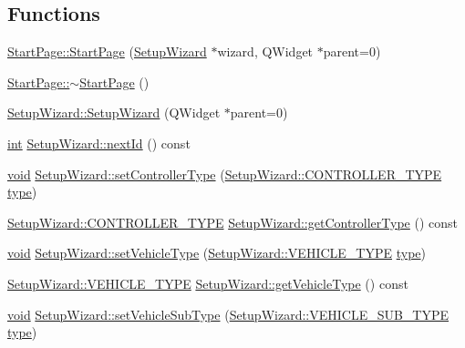 \subsection*{Functions}
\begin{DoxyCompactItemize}
\item 
\hyperlink{group___setup_gac7f13cdee5f6c7c47763882247c4dec8}{Start\-Page\-::\-Start\-Page} (\hyperlink{class_setup_wizard}{Setup\-Wizard} $\ast$wizard, Q\-Widget $\ast$parent=0)
\item 
\hyperlink{group___setup_ga03a08c78d6a2b73a4fe95bfa89e74314}{Start\-Page\-::$\sim$\-Start\-Page} ()
\item 
\hyperlink{group___setup_ga8f260c27631b936af1a8e2a9475ae2f0}{Setup\-Wizard\-::\-Setup\-Wizard} (Q\-Widget $\ast$parent=0)
\item 
\hyperlink{ioapi_8h_a787fa3cf048117ba7123753c1e74fcd6}{int} \hyperlink{group___setup_ga7e04c785013743eebd2ceb833536568d}{Setup\-Wizard\-::next\-Id} () const 
\item 
\hyperlink{group___u_a_v_objects_plugin_ga444cf2ff3f0ecbe028adce838d373f5c}{void} \hyperlink{group___setup_gab45587f98cb648017f85da303efa068c}{Setup\-Wizard\-::set\-Controller\-Type} (\hyperlink{group___vehicle_configuration_source_ga3cfce2b0a501a6fdb7a0ae408ba63556}{Setup\-Wizard\-::\-C\-O\-N\-T\-R\-O\-L\-L\-E\-R\-\_\-\-T\-Y\-P\-E} \hyperlink{glext_8h_a7d05960f4f1c1b11f3177dc963a45d86}{type})
\item 
\hyperlink{group___vehicle_configuration_source_ga3cfce2b0a501a6fdb7a0ae408ba63556}{Setup\-Wizard\-::\-C\-O\-N\-T\-R\-O\-L\-L\-E\-R\-\_\-\-T\-Y\-P\-E} \hyperlink{group___setup_ga1d7c4e20ee0857aef644a2e162ce51e7}{Setup\-Wizard\-::get\-Controller\-Type} () const 
\item 
\hyperlink{group___u_a_v_objects_plugin_ga444cf2ff3f0ecbe028adce838d373f5c}{void} \hyperlink{group___setup_gad78d95f5556264d0ceb480487ffadfb8}{Setup\-Wizard\-::set\-Vehicle\-Type} (\hyperlink{group___vehicle_configuration_source_gaa97253587c69ba0d23535abdc42fad43}{Setup\-Wizard\-::\-V\-E\-H\-I\-C\-L\-E\-\_\-\-T\-Y\-P\-E} \hyperlink{glext_8h_a7d05960f4f1c1b11f3177dc963a45d86}{type})
\item 
\hyperlink{group___vehicle_configuration_source_gaa97253587c69ba0d23535abdc42fad43}{Setup\-Wizard\-::\-V\-E\-H\-I\-C\-L\-E\-\_\-\-T\-Y\-P\-E} \hyperlink{group___setup_gac67d395a98064dde4cd243f78cdef9d4}{Setup\-Wizard\-::get\-Vehicle\-Type} () const 
\item 
\hyperlink{group___u_a_v_objects_plugin_ga444cf2ff3f0ecbe028adce838d373f5c}{void} \hyperlink{group___setup_gaceb7a4422958869c876dd43842e6960c}{Setup\-Wizard\-::set\-Vehicle\-Sub\-Type} (\hyperlink{group___vehicle_configuration_source_gaa22bfa88d750f2b46f66702a723e8342}{Setup\-Wizard\-::\-V\-E\-H\-I\-C\-L\-E\-\_\-\-S\-U\-B\-\_\-\-T\-Y\-P\-E} \hyperlink{glext_8h_a7d05960f4f1c1b11f3177dc963a45d86}{type})

\end{DoxyCompactItemize}
